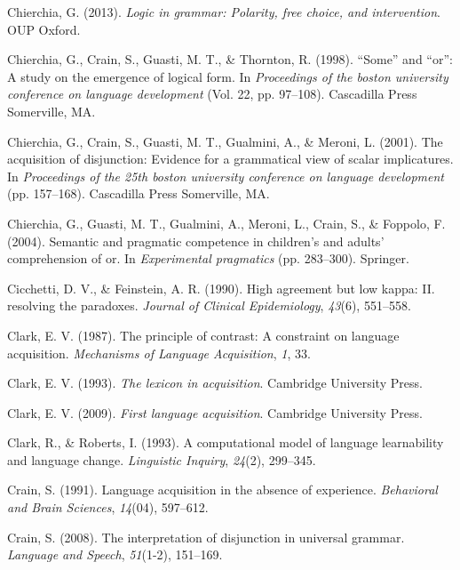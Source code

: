 \documentclass[oneside]{report}
\theoremstyle{definition}
\theoremstyle{definition}
\theoremstyle{definition}
\theoremstyle{remark}
\begin{document}
\hypertarget{ref-chierchia2013logic}{}
Chierchia, G. (2013). \emph{Logic in grammar: Polarity, free choice, and
intervention}. OUP Oxford.

\hypertarget{ref-chierchia1998some}{}
Chierchia, G., Crain, S., Guasti, M. T., \& Thornton, R. (1998).
``Some'' and ``or'': A study on the emergence of logical form. In
\emph{Proceedings of the boston university conference on language
development} (Vol. 22, pp. 97--108). Cascadilla Press Somerville, MA.

\hypertarget{ref-chierchia2001acquisition}{}
Chierchia, G., Crain, S., Guasti, M. T., Gualmini, A., \& Meroni, L.
(2001). The acquisition of disjunction: Evidence for a grammatical view
of scalar implicatures. In \emph{Proceedings of the 25th boston
university conference on language development} (pp. 157--168).
Cascadilla Press Somerville, MA.

\hypertarget{ref-chierchia2004semantic}{}
Chierchia, G., Guasti, M. T., Gualmini, A., Meroni, L., Crain, S., \&
Foppolo, F. (2004). Semantic and pragmatic competence in children's and
adults' comprehension of or. In \emph{Experimental pragmatics} (pp.
283--300). Springer.

\hypertarget{ref-cicchetti1990high}{}
Cicchetti, D. V., \& Feinstein, A. R. (1990). High agreement but low
kappa: II. resolving the paradoxes. \emph{Journal of Clinical
Epidemiology}, \emph{43}(6), 551--558.

\hypertarget{ref-clark1987principle}{}
Clark, E. V. (1987). The principle of contrast: A constraint on language
acquisition. \emph{Mechanisms of Language Acquisition}, \emph{1}, 33.

\hypertarget{ref-clark1993lexicon}{}
Clark, E. V. (1993). \emph{The lexicon in acquisition}. Cambridge
University Press.

\hypertarget{ref-clark2009first}{}
Clark, E. V. (2009). \emph{First language acquisition}. Cambridge
University Press.

\hypertarget{ref-clark1993computational}{}
Clark, R., \& Roberts, I. (1993). A computational model of language
learnability and language change. \emph{Linguistic Inquiry},
\emph{24}(2), 299--345.

\hypertarget{ref-crain1991language}{}
Crain, S. (1991). Language acquisition in the absence of experience.
\emph{Behavioral and Brain Sciences}, \emph{14}(04), 597--612.

\hypertarget{ref-crain2008interpretation}{}
Crain, S. (2008). The interpretation of disjunction in universal
grammar. \emph{Language and Speech}, \emph{51}(1-2), 151--169.
\end{document}
